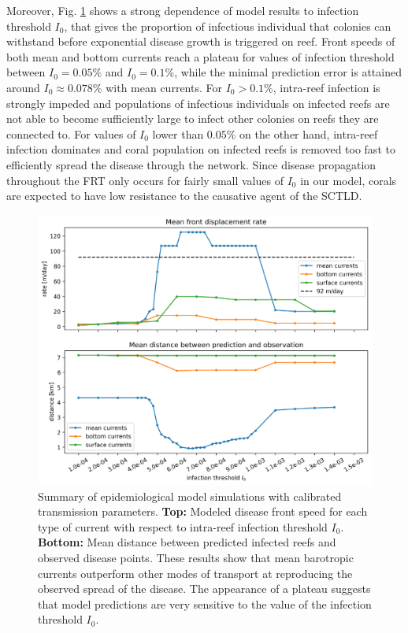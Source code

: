 \documentclass[utf8]{frontiersSCNS}
\begin{document}
Moreover, Fig. \ref{fig:results} shows a strong dependence of model results to infection threshold $I_0$, that gives the proportion of infectious individual that colonies can withstand before exponential disease growth is triggered on reef. Front speeds of both mean and bottom currents reach a plateau for values of infection threshold between $I_0=0.05\%$ and $I_0=0.1\%$, while the minimal prediction error is attained around $I_0 \approx 0.078\%$ with mean currents. For $I_0 > 0.1\%$, intra-reef infection is strongly impeded and populations of infectious individuals on infected reefs are not able to become sufficiently large to infect other colonies on reefs they are connected to. For values of $I_0$ lower than $0.05\%$ on the other hand, intra-reef infection dominates and coral population on infected reefs is removed too fast to efficiently spread the disease through the network. Since disease propagation throughout the FRT only occurs for fairly small values of $I_0$ in our model, corals are expected to have low resistance to the causative agent of the SCTLD. 

\begin{figure}
    \centering
    \includegraphics[width=.8\textwidth]{figures/sctld_validation_corrected.png}
    \caption{Summary of epidemiological model simulations with calibrated transmission parameters. \textbf{Top:} Modeled disease front speed for each type of current with respect to intra-reef infection threshold $I_0$. \textbf{Bottom:} Mean distance between predicted infected reefs and observed disease points. These results show that mean barotropic currents outperform other modes of transport at reproducing the observed spread of the disease. The appearance of a plateau suggests that model predictions are very sensitive to the value of the infection threshold $I_0$.}
    \label{fig:results}
\end{figure}
\end{document}
